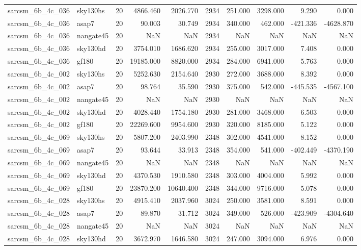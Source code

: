\documentclass{article}
\begin{document}
\begin{longtable}{llrrrrrrrr}
sarcsm\_6b\_4c\_036 & sky130hs & 20 & 4866.460 & 2026.770 & 2934 & 251.000 & 3298.000 & 9.290 & 0.000 \\
sarcsm\_6b\_4c\_036 & asap7 & 20 & 90.003 & 30.749 & 2934 & 340.000 & 462.000 & -421.336 & -4628.870 \\
sarcsm\_6b\_4c\_036 & nangate45 & 20 & NaN & NaN & 2934 & NaN & NaN & NaN & NaN \\
sarcsm\_6b\_4c\_036 & sky130hd & 20 & 3754.010 & 1686.620 & 2934 & 255.000 & 3017.000 & 7.408 & 0.000 \\
sarcsm\_6b\_4c\_036 & gf180 & 20 & 19185.000 & 8820.000 & 2934 & 284.000 & 6941.000 & 5.763 & 0.000 \\
sarcsm\_6b\_4c\_002 & sky130hs & 20 & 5252.630 & 2154.640 & 2930 & 272.000 & 3688.000 & 8.392 & 0.000 \\
sarcsm\_6b\_4c\_002 & asap7 & 20 & 98.764 & 35.590 & 2930 & 375.000 & 542.000 & -445.535 & -4567.100 \\
sarcsm\_6b\_4c\_002 & nangate45 & 20 & NaN & NaN & 2930 & NaN & NaN & NaN & NaN \\
sarcsm\_6b\_4c\_002 & sky130hd & 20 & 4028.440 & 1754.180 & 2930 & 281.000 & 3468.000 & 6.503 & 0.000 \\
sarcsm\_6b\_4c\_002 & gf180 & 20 & 22269.600 & 9954.600 & 2930 & 320.000 & 8185.000 & 5.122 & 0.000 \\
sarcsm\_6b\_4c\_069 & sky130hs & 20 & 5807.200 & 2403.990 & 2348 & 302.000 & 4541.000 & 8.152 & 0.000 \\
sarcsm\_6b\_4c\_069 & asap7 & 20 & 93.644 & 33.913 & 2348 & 354.000 & 541.000 & -402.449 & -4370.190 \\
sarcsm\_6b\_4c\_069 & nangate45 & 20 & NaN & NaN & 2348 & NaN & NaN & NaN & NaN \\
sarcsm\_6b\_4c\_069 & sky130hd & 20 & 4370.530 & 1910.580 & 2348 & 303.000 & 4004.000 & 5.992 & 0.000 \\
sarcsm\_6b\_4c\_069 & gf180 & 20 & 23870.200 & 10640.400 & 2348 & 344.000 & 9716.000 & 5.078 & 0.000 \\
sarcsm\_6b\_4c\_028 & sky130hs & 20 & 4915.410 & 2037.960 & 3024 & 250.000 & 3581.000 & 8.591 & 0.000 \\
sarcsm\_6b\_4c\_028 & asap7 & 20 & 89.870 & 31.712 & 3024 & 349.000 & 526.000 & -423.909 & -4304.640 \\
sarcsm\_6b\_4c\_028 & nangate45 & 20 & NaN & NaN & 3024 & NaN & NaN & NaN & NaN \\
sarcsm\_6b\_4c\_028 & sky130hd & 20 & 3672.970 & 1646.580 & 3024 & 247.000 & 3094.000 & 6.976 & 0.000 \\

\end{longtable}
\end{document}
